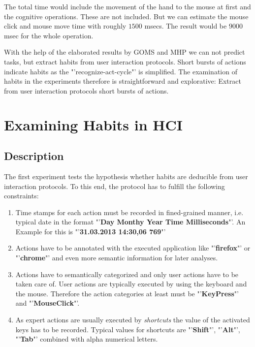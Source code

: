 The total time would include the movement of the hand to the mouse at first and the cognitive operations. These are not included. But we can estimate the mouse click and mouse move time with roughly $1500$ msecs. The result would be $9000$ msec for the whole operation. 

With the help of the elaborated results by \ac{GOMS} and \ac{MHP} we can not predict tasks, but extract habits from user interaction protocols. Short bursts of actions indicate habits as the "'recognize-act-cycle"' is simplified. The examination of habits in the experiments therefore is straightforward and explorative: Extract from user interaction protocols short bursts of actions. 


\section{Examining Habits in \acf{HCI}}
\label{habits}
\subsection{Description}
\label{habits_description}
The first experiment tests the hypothesis whether habits are deducible from user interaction protocols. To this end, the protocol has to fulfill the following constraints: 

\begin{enumerate}
  \item Time stamps for each action must be recorded in fined-grained manner, i.e. typical date in the format "'\textbf{Day Monthy Year Time Milliseconds}"'. An Example for this is "'\textbf{31.03.2013 14:30,06 769}"'
  \item Actions have to be annotated with the executed application like "'\textbf{firefox}"' or "'\textbf{chrome}"' and even more semantic information for later analyses. 
  \item Actions have to semantically categorized and only user actions have to be taken care of. User actions are typically executed by using the keyboard and the mouse. Therefore the action categories at least must be "'\textbf{KeyPress}"' and "'\textbf{MouseClick}"'.
  \item As expert actions are usually executed by \textit{shortcuts} the value of the activated keys has to be recorded. Typical values for shortcuts are "'\textbf{Shift}"', "'\textbf{Alt}"', "'\textbf{Tab}"' combined with alpha numerical letters.
\end{enumerate}

